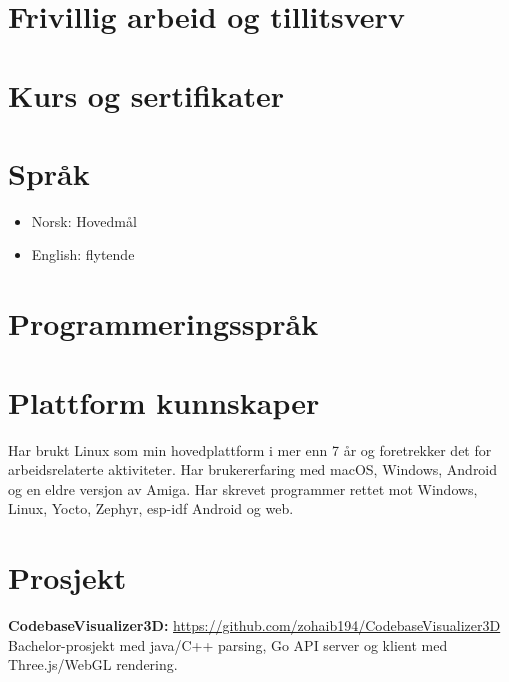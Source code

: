 \documentclass[norsk]{../crudecv/crudecv}
\begin{document}
\section*{Frivillig arbeid og tillitsverv}
\begin{experiences}
\end{experiences}

\section*{Kurs og sertifikater}
\begin{experiences}
\end{experiences}

\section*{Språk}
\begin{itemize}
\item Norsk: Hovedmål
\item English: flytende
\end{itemize}


\section*{Programmeringsspråk}
\begin{skills}
\end{skills}


\section*{Plattform kunnskaper}
Har brukt Linux som min hovedplattform i mer enn 7 år og foretrekker det for
arbeidsrelaterte aktiviteter. Har brukererfaring med macOS, Windows, Android
og en eldre versjon av Amiga. Har skrevet programmer rettet mot Windows,
Linux, Yocto, Zephyr, esp-idf Android og web.

\section*{Prosjekt}
\textbf{CodebaseVisualizer3D:} \hfill \href{https://github.com/zohaib194/CodebaseVisualizer3D}{https://github.com/zohaib194/CodebaseVisualizer3D} \\
Bachelor-prosjekt med java/C++ parsing, Go API server og klient med Three.js/WebGL rendering.
\end{document}
